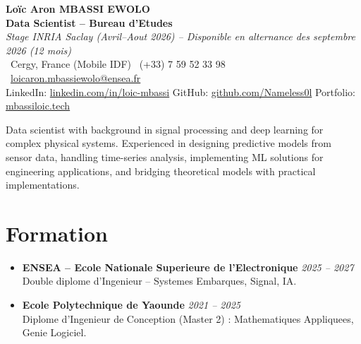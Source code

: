\documentclass[a4paper,11pt]{article}
\begin{document}
\begin{center}
    {\Large \textbf{Lo\"ic Aron MBASSI EWOLO}} \\ \vspace{4pt}
    \textbf{\large Data Scientist -- Bureau d'Etudes} \\
    \textit{\small Stage INRIA Saclay (Avril--Aout 2026) -- Disponible en alternance des septembre 2026 (12 mois)} \\ \vspace{4pt}
    \small
    \Pointinghand\ Cergy, France (Mobile IDF) \quad
    \Mobilefone\ (+33) 7 59 52 33 98 \quad
    {\color{primary}\Letter\ \href{mailto:loicaron.mbassiewolo@ensea.fr}{loicaron.mbassiewolo@ensea.fr}} \\ \vspace{2pt}
    {\color{primary}LinkedIn: \href{https://www.linkedin.com/in/loic-mbassi/}{linkedin.com/in/loic-mbassi}} \quad
    {\color{primary}GitHub: \href{https://github.com/Nameless0l}{github.com/Nameless0l}} \quad
    {\color{primary}Portfolio: \href{https://mbassiloic.tech}{mbassiloic.tech}}
\end{center}

\vspace{-6pt}

\noindent\small{Data scientist with background in signal processing and deep learning for complex physical systems. Experienced in designing predictive models from sensor data, handling time-series analysis, implementing ML solutions for engineering applications, and bridging theoretical models with practical implementations.}

\section{Formation}
\begin{itemize}[leftmargin=*, label=\tiny$\bullet$, nosep]
    \item \textbf{ENSEA -- Ecole Nationale Superieure de l'Electronique} \hfill \textit{2025 -- 2027} \\
    \small{Double diplome d'Ingenieur -- Systemes Embarques, Signal, IA.}
    \item \textbf{Ecole Polytechnique de Yaounde} \hfill \textit{2021 -- 2025} \\
    \small{Diplome d'Ingenieur de Conception (Master 2) : Mathematiques Appliquees, Genie Logiciel.}
\end{itemize}
\end{document}
